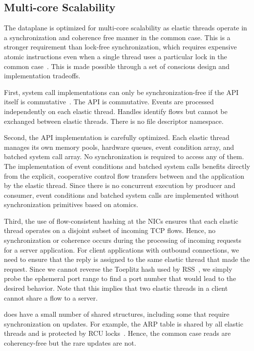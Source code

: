 \subsection{Multi-core Scalability}
\label{sec:impl:cohfree}

The \ix dataplane is optimized for multi-core scalability as elastic
threads operate in a synchronization and coherence free manner in the
common case. This is a stronger requirement than lock-free
synchronization, which requires expensive atomic instructions even
when a single thread uses a particular lock in the common
case~\cite{DBLP:conf/sosp/DavidGT13}.  This is made possible through a
set of conscious design and implementation tradeoffs.

First, system call implementations can only be synchronization-free if
the API itself is
commutative~\cite{DBLP:conf/sosp/ClementsKZMK13}. The \ix API is
commutative. Events are processed independently on each elastic
thread. Handles identify flows but cannot be exchanged between elastic
threads. There is no file descriptor namespace.

Second, the API implementation is carefully optimized.  Each elastic
thread manages its own memory pools, hardware queues, event condition
array, and batched system call array. No synchronization is required
to access any of them. The implementation of event conditions and
batched system calls benefits directly from the explicit, cooperative
control flow transfers between \ix and the application by the elastic
thread.  Since there is no concurrent execution by producer and
consumer, event conditions and batched system calls are implemented
without synchronization primitives based on atomics.

Third, the use of flow-consistent hashing at the NICs ensures that
each elastic thread operates on a disjoint subset of incoming TCP
flows. Hence, no synchronization or coherence occurs during the
processing of incoming requests for a server application. For client
applications with outbound connections, we need to ensure that the
reply is assigned to the same elastic thread that made the
request. Since we cannot reverse the Toeplitz hash used by
RSS~\cite{url:rss}, we simply probe the ephemeral port range to find a
port number that would lead to the desired behavior. Note that this
implies that two elastic threads in a client cannot share a flow to a
server.


\ix does have a small number of shared structures, including some that
require synchronization on updates.  For example, the ARP table is
shared by all elastic threads and is protected by RCU
locks~\cite{mckenney1998read}. Hence, the common case reads are
coherency-free but the rare updates are not.
%


